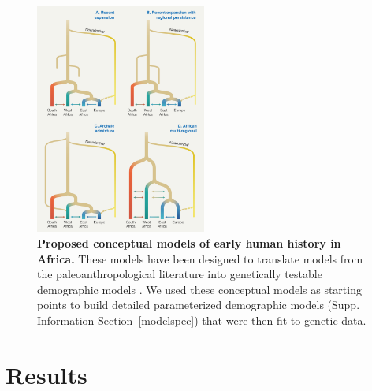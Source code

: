 \documentclass[]{article}
\begin{document}
\begin{figure}[ht]
    \centering
    \includegraphics[width=0.5\textwidth]{figures/proposed-models.png}
    \caption{
        \textbf{Proposed conceptual models of early human history in Africa.}
        These models have been designed to translate models from the 
        paleoanthropological literature into genetically testable demographic
        models \citep{Henn2018-rf}.
        We used these conceptual models as starting points to build detailed
        parameterized demographic models (Supp. Information Section~\ref{modelspec})
        that were then fit to genetic data. 
    }
    \label{fig:proposed-models}
\end{figure}


\section*{Results}
\end{document}
